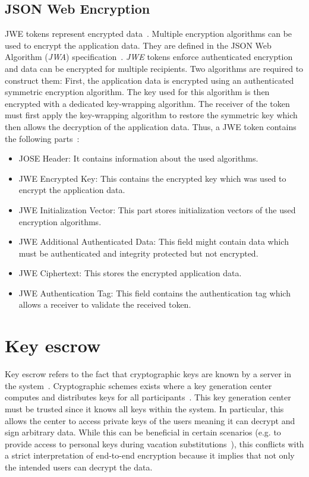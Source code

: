 \documentclass[../main.tex]{subfiles}
\begin{document}
\subsection{JSON Web Encryption}
JWE tokens represent encrypted data~\cite{JWE2015}.
Multiple encryption algorithms can be used to encrypt the application data.
They are defined in the JSON Web Algorithm (\emph{JWA}) specification~\cite{JWA2015}.
\emph{JWE} tokens enforce authenticated encryption and data can be encrypted for multiple recipients.
Two algorithms are required to construct them:
First, the application data is encrypted using an authenticated symmetric encryption algorithm.
The key used for this algorithm is then encrypted with a dedicated key-wrapping algorithm.
The receiver of the token must first apply the key-wrapping algorithm to restore the symmetric key which then allows the decryption of the application data.
Thus, a JWE token contains the following parts~\cite{JWE2015}:
\begin{itemize}
    \item JOSE Header:
    It contains information about the used algorithms.
    \item JWE Encrypted Key:
    This contains the encrypted key which was used to encrypt the application data.
    \item JWE Initialization Vector: This part stores initialization vectors of the used encryption algorithms.
    \item JWE Additional Authenticated Data: This field might contain data which must be authenticated and integrity protected but not encrypted.
    \item JWE Ciphertext: This stores the encrypted application data.
    \item JWE Authentication Tag: This field contains the authentication tag which allows a receiver to validate the received token.
\end{itemize}


\section{Key escrow}
\label{sec:key-escrow}
Key escrow refers to the fact that cryptographic keys are known by a server in the system~\cite{Gentry2003}.
Cryptographic schemes exists where a key generation center computes and distributes keys for all participants~\cite{Sakai2007, Bethencourt2007}.
This key generation center must be trusted since it knows all keys within the system.
In particular, this allows the center to access private keys of the users meaning it can decrypt and sign arbitrary data.
While this can be beneficial in certain scenarios (e.g. to provide access to personal keys during vacation substitutions~\cite{Hagg2022}), this conflicts with a strict interpretation of end-to-end encryption because it implies that not only the intended users can decrypt the data.
\end{document}
